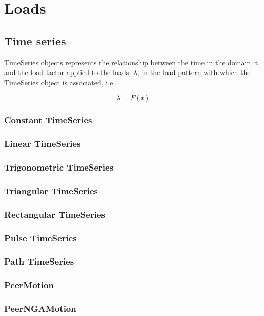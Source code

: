 \chapter{Loads}

\section{Time series}
TimeSeries objects represents the relationship between the time in the domain, t, and the load factor applied to the loads, $\lambda$, in the load pattern with which the TimeSeries object is associated, i.e.

\begin{equation}
  \lambda= F(t)
\end{equation}

\subsection{Constant TimeSeries}

\subsection{Linear TimeSeries}

\subsection{Trigonometric TimeSeries}

\subsection{Triangular TimeSeries}

\subsection{Rectangular TimeSeries}

\subsection{Pulse TimeSeries}

\subsection{Path TimeSeries}

\subsection{PeerMotion}

\subsection{PeerNGAMotion}
